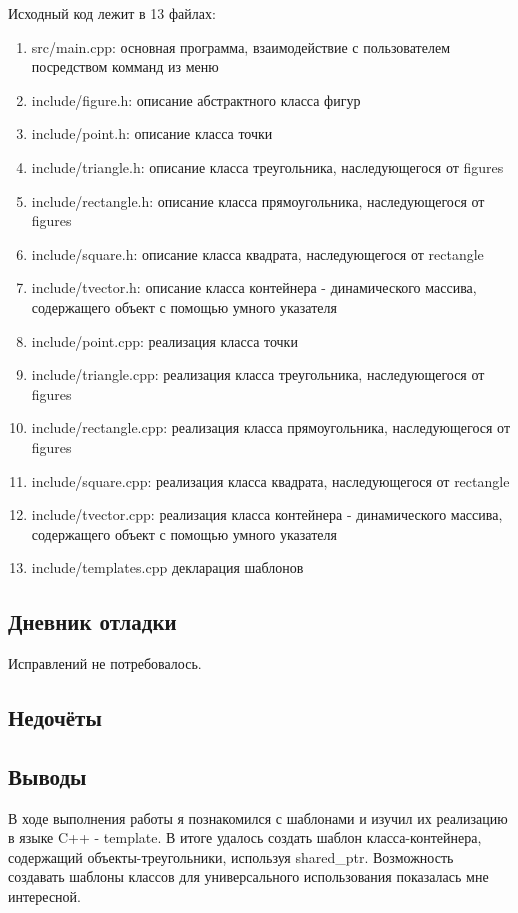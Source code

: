 \documentclass[12pt]{article}
\begin{document}
Исходный код лежит в 13 файлах:
\begin{enumerate}
\item src/main.cpp: основная программа, взаимодействие с пользователем посредством комманд из меню

\item include/figure.h:    описание абстрактного класса фигур

\item include/point.h:     описание класса точки
\item include/triangle.h:  описание класса треугольника, наследующегося от figures
\item include/rectangle.h: описание класса прямоугольника, наследующегося от figures
\item include/square.h:    описание класса квадрата, наследующегося от rectangle
\item include/tvector.h:   описание класса контейнера - динамического массива, содержащего объект с помощью умного указателя

\item include/point.cpp:     реализация класса точки
\item include/triangle.cpp:  реализация класса треугольника, наследующегося от figures
\item include/rectangle.cpp: реализация класса прямоугольника, наследующегося от figures
\item include/square.cpp:    реализация класса квадрата, наследующегося от rectangle
\item include/tvector.cpp:   реализация класса контейнера - динамического массива, содержащего объект с помощью умного указателя
\item include/templates.cpp  декларация шаблонов

\end{enumerate}

\subsection*{Дневник отладки}
Исправлений не потребовалось.


\subsection*{Недочёты}


\subsection*{Выводы}
В ходе выполнения работы я познакомился с шаблонами и изучил их реализацию в языке C++ - template. В итоге удалось создать шаблон класса-контейнера, содержащий объекты-треугольники, используя shared\_ptr. Возможность создавать шаблоны классов для универсального использования показалась мне интересной.
\end{document}
